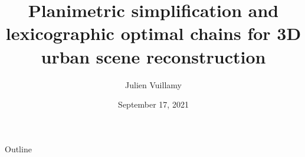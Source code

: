 \documentclass{beamer}
\title{Planimetric simplification and lexicographic optimal chains for 3D urban scene reconstruction}
\author[Julien Vuillamy]{Julien Vuillamy}
\institute[]{Dassault Systèmes Provence - INRIA Sophia Antipolis TITANE}
\date{September 17, 2021}
\begin{document}
	\begin{frame}
		\titlepage
	\end{frame}
		
	\begin{frame}{Outline}
	\end{frame}
	
	
	
	
	
		
	\appendix
	
	




\end{document}
